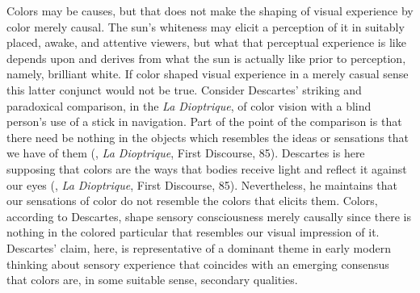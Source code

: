 Colors may be causes, but that does not make the shaping of visual experience by color merely causal. The sun's whiteness may elicit a perception of it in suitably placed, awake, and attentive viewers, but what that perceptual experience is like depends upon and derives from what the sun is actually like prior to perception, namely, brilliant white. If color shaped visual experience in a merely casual sense this latter conjunct would not be true. Consider Descartes' \citeyearpar{Descartes:1637uq} striking and paradoxical comparison, in the \emph{La Dioptrique}, of color vision with a blind person's use of a stick in navigation. Part of the point of the comparison is that there need be nothing in the objects which resembles the ideas or sensations that we have of them (\citealt{Descartes:1637uq}, \emph{La Dioptrique}, First Discourse, 85). Descartes is here supposing that colors are the ways that bodies receive light and reflect it against our eyes (\citealt{Descartes:1637uq}, \emph{La Dioptrique}, First Discourse, 85). Nevertheless, he maintains that our sensations of color do not resemble the colors that elicits them. Colors, according to Descartes, shape sensory consciousness merely causally since there is nothing in the colored particular that resembles our visual impression of it. Descartes' claim, here, is representative of a dominant theme in early modern thinking about sensory experience that coincides with an emerging consensus that colors are, in some suitable sense, secondary qualities.


